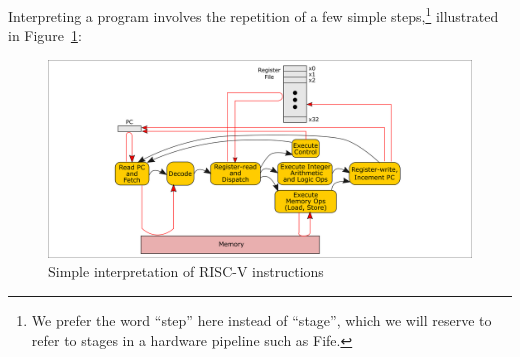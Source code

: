 Interpreting a program involves the repetition of a few simple
steps,\footnote{We prefer the word ``step'' here instead of ``stage'',
which we will reserve to refer to stages in a hardware pipeline such
as Fife.}  illustrated in
Figure~\ref{Fig_Simple_Instr_Exec}:
\begin{figure}[htbp]
  \centerline{\includegraphics[width=6in,angle=0]{ch030_RISCV_Design_Space/Figures/Fig_Simple_Instr_Exec}}
  \caption{\label{Fig_Simple_Instr_Exec}Simple interpretation of RISC-V instructions}
\end{figure}
